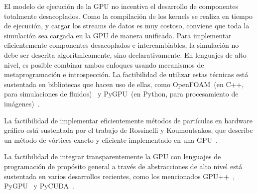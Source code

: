 \documentclass[11pt,spanish]{article}
\begin{document}


El modelo de ejecución de la GPU no incentiva el desarrollo de componentes
totalmente desacoplados.  Como la compilación de los kernels se realiza en tiempo
de ejecución, y cargar los streams de datos es muy costoso, conviene
que toda la simulación sea cargada en la GPU de manera unificada.  Para
implementar eficientemente componentes desacoplados e intercambiables,
la simulación no debe ser descrita algorítmicamente, sino declarativamente.  En
lenguajes de alto nivel, es posible combinar ambos enfoques usando mecanismos de
metaprogramación e introspección.  La factibilidad de utilizar estas técnicas
está sustentada en bibliotecas que hacen uso de ellas, como OpenFOAM~(en C++,
para simulaciones de fluidos)~\cite{openfoam} y PyGPU~(en Python, para
procesamiento de imágenes)~\cite{pygpu}.

La factibilidad de implementar eficientemente métodos de partículas en hardware
gráfico está sustentada por el trabajo de Rossinelli y Koumoutsakos, que
describe un método de vórtices exacto y eficiente implementado en una
GPU~\cite{vortex-gpu}.

La factibilidad de integrar transparentemente la GPU con lenguajes de
programación de propósito general a través de abstracciones de alto nivel está
sustentada en varios desarrollos recientes, como los mencionados
GPU++~\cite{gpupp}, PyGPU~\cite{pygpu} y PyCUDA~\cite{pycuda}.
\end{document}
